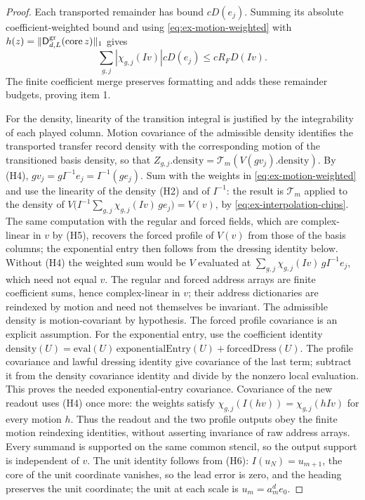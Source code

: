 \begin{proof}
Each transported remainder has bound $cD(e_j)$. Summing its
absolute coefficient-weighted bound and using
\eqref{eq:ex-motion-weighted} with
$h(z)=\|\mathsf D^{\rm gr}_{d,L}(\operatorname{core}z)\|_1$ gives
\[
 \sum_{g,j}|\chi_{g,j}(Iv)|cD(e_j)
       \le cR_FD(Iv).
\]
The finite coefficient merge preserves formatting and adds these remainder
budgets, proving item 1.

For the density, linearity of the transition integral is justified by the
integrability of each played column. Motion covariance of the admissible density
identifies the transported transfer record density with the corresponding motion of
the transitioned basis density, so that
$Z_{g,j}.\mathrm{density}=\mathcal T_m(V(gv_j).\mathrm{density})$. By (H4),
$gv_j=gI^{-1}e_j=I^{-1}(ge_j)$. Sum with the weights in \eqref{eq:ex-motion-weighted} and use the
linearity of the density (H2) and of $I^{-1}$: the result is $\mathcal T_m$
applied to the density of
$V\bigl(I^{-1}\sum_{g,j}\chi_{g,j}(Iv)\,g e_j\bigr)=V(v)$, by
\eqref{eq:ex-interpolation-chips}. The same computation with the regular and
forced fields, which are complex-linear in $v$ by (H5), recovers the forced
profile of $V(v)$ from those of the basis columns; the exponential entry
then follows from the dressing identity below. Without (H4) the weighted sum
would be $V$ evaluated at $\sum_{g,j}\chi_{g,j}(Iv)\,gI^{-1}e_j$, which need
not equal $v$. The regular and forced address arrays are finite coefficient sums, hence
complex-linear in $v$; their address dictionaries are reindexed by motion
and need not themselves be invariant. The admissible density is motion-covariant
by hypothesis. The forced profile covariance is an explicit assumption. For the
exponential entry, use the coefficient identity
$\mathrm{density}(U)=\mathrm{eval}(U)\,\mathrm{exponentialEntry}(U)
+\mathrm{forcedDress}(U)$. The profile covariance and lawful dressing
identity give covariance of the last term; subtract it from the density
covariance identity and divide by the nonzero local evaluation. This proves
the needed exponential-entry covariance.
Covariance of the new readout uses (H4) once more: the weights satisfy
$\chi_{g,j}(I(hv))=\chi_{g,j}(hIv)$ for every motion $h$. Thus the readout
and the two profile outputs obey the finite motion reindexing identities, without asserting invariance of raw address arrays.
Every summand is supported on the same common stencil, so the output support
is independent of $v$. The unit identity follows from (H6): $I(u_N)=u_{m+1}$, the core of the
unit coordinate vanishes, so the lead error is zero, and the heading
preserves the unit coordinate; the unit at each scale is $u_m=a_m^de_0$.


\end{proof}
